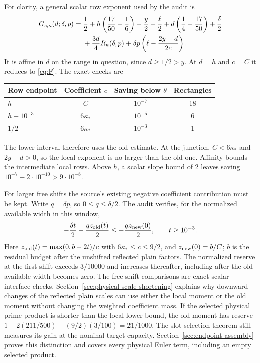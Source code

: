 \documentclass[11pt]{article}
\theoremstyle{definition}
\begin{document}
For clarity, a general scalar row exponent used by the audit is
\begin{align}\label{eq:G}
 G_{c,\kappa}(d;\delta,p)={}&\frac12
 +h\left(\frac{17}{50}-\frac16\right)-\frac y2-\frac\ell2
 +d\left(\frac14-\frac{17}{50}\right)+\frac\delta2\notag\\
 &+\frac{3d}{4}R_\kappa(\delta,p)
 +\delta p\left(\ell-\frac{2y-d}{2c}\right).
\end{align}
It is affine in $d$ on the range in question, since $d\ge1/2>y$.
At $d=h$ and $c=C$ it reduces to \eqref{eq:F}. The exact checks are
\begin{center}
\begin{tabular}{lccc}
\toprule
Row endpoint & Coefficient $c$ & Saving below $\theta$ & Rectangles\\
\midrule
$h$ & $C$ & $10^{-7}$ & 18\\
$h-10^{-3}$ & $6\kappa_*$ & $10^{-5}$ & 6\\
$1/2$ & $6\kappa_*$ & $10^{-3}$ & 1\\
\bottomrule
\end{tabular}
\end{center}
The lower interval therefore uses the old estimate. At the junction,
$C<6\kappa_*$ and $2y-d>0$, so the local exponent is no larger
than the old one. Affinity bounds the intermediate local rows. Above
$h$, a scalar slope bound of $2$ leaves saving
$10^{-7}-2\cdot10^{-10}>9\cdot10^{-8}$.

For larger free shifts the source's existing negative coefficient
contribution must be kept. Write $q=\delta p$, so $0\le q\le\delta/2$.
The audit verifies, for the normalized available width in this window,
\[
 -\frac{\delta t}{2}-\frac{qz_{\rm old}(t)}2
 \le-\frac{qz_{\rm new}(0)}2,\qquad t\ge10^{-3}.
\]
Here $z_{\rm old}(t)=\max(0,b-2t)/c$ with
$6\kappa_*\le c\le9/2$, and $z_{\rm new}(0)=b/C$; $b$ is the
residual budget after the unshifted reflected plain factors. The
normalized reserve at the first shift exceeds $3/10000$ and increases
thereafter, including after the old available width becomes zero.
The free-shift comparisons are exact scalar interface checks.
Section~\ref{sec:physical-scale-shortening} explains why downward changes
of the reflected plain scales can use either the local moment or the old
moment without changing the weighted coefficient mass. If the selected
physical prime product is shorter than the local lower bound, the old
moment has reserve $1-2(211/500)-(9/2)(3/100)=21/1000$.
The slot-selection theorem still measures its gain at the nominal target
capacity. Section~\ref{sec:endpoint-assembly} proves this distinction and
covers every physical Euler term, including an empty selected product.
\end{document}
